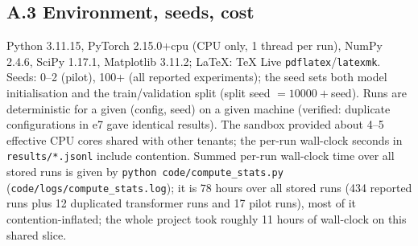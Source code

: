 \subsection*{A.3 Environment, seeds, cost}
Python 3.11.15, PyTorch 2.15.0+cpu (CPU only, 1 thread per run), NumPy 2.4.6, SciPy 1.17.1, Matplotlib 3.11.2; LaTeX: TeX Live \texttt{pdflatex}/\texttt{latexmk}. Seeds: 0--2 (pilot), 100+ (all reported experiments); the seed sets both model initialisation and the train/validation split (split seed $=10000+$seed). Runs are deterministic for a given (config, seed) on a given machine (verified: duplicate configurations in e7 gave identical results).
The sandbox provided about 4--5 effective CPU cores shared with other tenants; the per-run wall-clock seconds in \texttt{results/*.jsonl} include contention. Summed per-run wall-clock time over all stored runs is given by \texttt{python code/compute\_stats.py} (\texttt{code/logs/compute\_stats.log}); it is 78 hours over all stored runs (434 reported runs plus 12 duplicated transformer runs and 17 pilot runs), most of it contention-inflated; the whole project took roughly 11 hours of wall-clock on this shared slice.

